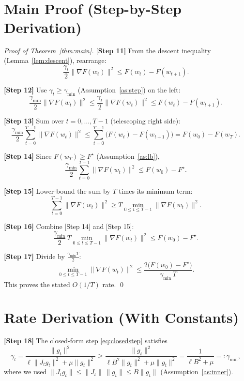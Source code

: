\documentclass[11pt]{article}
\begin{document}
\section*{Main Proof (Step-by-Step Derivation)}

\begin{proof}[Proof of Theorem~\ref{thm:main}]

\textbf{[Step 11]} From the descent inequality (Lemma~\ref{lem:descent}),
rearrange:
\[
\frac{\gamma_t}{2}\|\nabla F(w_t)\|^2 \le F(w_t) - F(w_{t+1}).
\]

\textbf{[Step 12]} Use $\gamma_t \ge \gamma_{\min}$ (Assumption~\ref{as:step})
on the left:
\[
\frac{\gamma_{\min}}{2}\|\nabla F(w_t)\|^2
\le \frac{\gamma_t}{2}\|\nabla F(w_t)\|^2
\le F(w_t) - F(w_{t+1}).
\]

\textbf{[Step 13]} Sum over $t = 0,\dots,T-1$ (telescoping right side):
\[
\frac{\gamma_{\min}}{2}\sum_{t=0}^{T-1}\|\nabla F(w_t)\|^2
\le \sum_{t=0}^{T-1}\big(F(w_t)-F(w_{t+1})\big)
= F(w_0) - F(w_T).
\]

\textbf{[Step 14]} Since $F(w_T)\ge F^\star$ (Assumption~\ref{as:lb}),
\[
\frac{\gamma_{\min}}{2}\sum_{t=0}^{T-1}\|\nabla F(w_t)\|^2
\le F(w_0) - F^\star .
\]

\textbf{[Step 15]} Lower-bound the sum by $T$ times its minimum term:
\[
\sum_{t=0}^{T-1}\|\nabla F(w_t)\|^2
\ge T \min_{0\le t\le T-1}\|\nabla F(w_t)\|^2 .
\]

\textbf{[Step 16]} Combine [Step 14] and [Step 15]:
\[
\frac{\gamma_{\min}}{2}\, T \min_{0\le t\le T-1}\|\nabla F(w_t)\|^2
\le F(w_0) - F^\star .
\]

\textbf{[Step 17]} Divide by $\tfrac{\gamma_{\min} T}{2}$:
\[
\min_{0\le t\le T-1}\|\nabla F(w_t)\|^2
\le \frac{2\big(F(w_0)-F^\star\big)}{\gamma_{\min}\, T}.
\]
This proves the stated $O(1/T)$ rate. \qed
\end{proof}

\section*{Rate Derivation (With Constants)}

\textbf{[Step 18]} The closed-form step \eqref{eq:closedstep} satisfies
\[
\gamma_t = \frac{\|g_t\|^2}{\ell\|J_t g_t\|^2 + \mu\|g_t\|^2}
\ge \frac{\|g_t\|^2}{\ell B^2\|g_t\|^2 + \mu\|g_t\|^2}
= \frac{1}{\ell B^2 + \mu} =: \gamma_{\min},
\]
where we used $\|J_t g_t\|\le \|J_t\|\,\|g_t\| \le B\|g_t\|$
(Assumption~\ref{as:inner}).
\end{document}
